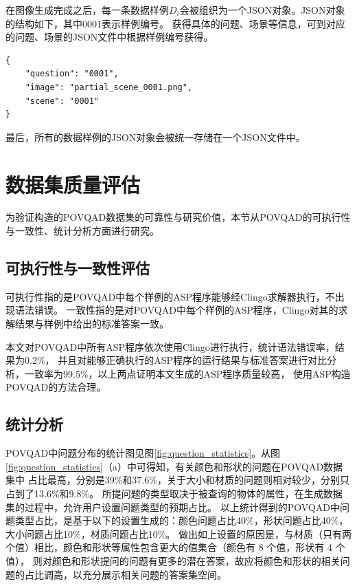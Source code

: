 在图像生成完成之后，每一条数据样例$D_i$会被组织为一个JSON对象。JSON对象的结构如下，其中0001表示样例编号。
获得具体的问题、场景等信息，可到对应的问题、场景的JSON文件中根据样例编号获得。
\begin{lstlisting}
{
    "question": "0001",
    "image": "partial_scene_0001.png",
    "scene": "0001"
}
\end{lstlisting}

最后，所有的数据样例的JSON对象会被统一存储在一个JSON文件中。
\section{数据集质量评估}
为验证构造的POVQAD数据集的可靠性与研究价值，本节从POVQAD的可执行性与一致性、统计分析方面进行研究。
\subsection{可执行性与一致性评估}
可执行性指的是POVQAD中每个样例的ASP程序能够经Clingo求解器执行，不出现语法错误。
一致性指的是对POVQAD中每个样例的ASP程序，Clingo对其的求解结果与样例中给出的标准答案一致。

本文对POVQAD中所有ASP程序依次使用Clingo进行执行，统计语法错误率，结果为0.2\%，
并且对能够正确执行的ASP程序的运行结果与标准答案进行对比分析，一致率为99.5\%，以上两点证明本文生成的ASP程序质量较高，
使用ASP构造POVQAD的方法合理。
\subsection{统计分析}
POVQAD中问题分布的统计图见图\ref{fig:question_statistics}。从图\ref{fig:question_statistics}（a）中可得知，有关颜色和形状的问题在POVQAD数据集中
占比最高，分别是39\%和37.6\%，关于大小和材质的问题则相对较少，分别只占到了13.6\%和9.8\%。
所提问题的类型取决于被查询的物体的属性，在生成数据集的过程中，允许用户设置问题类型的预期占比。
以上统计得到的POVQAD中问题类型占比，是基于以下的设置生成的：颜色问题占比40\%，形状问题占比40\%，大小问题占比10\%，材质问题占比10\%。
做出如上设置的原因是，与材质（只有两个值）相比，颜色和形状等属性包含更大的值集合（颜色有 8 个值，形状有 4 个值），
则对颜色和形状提问的问题有更多的潜在答案，故应将颜色和形状的相关问题的占比调高，以充分展示相关问题的答案集空间。

